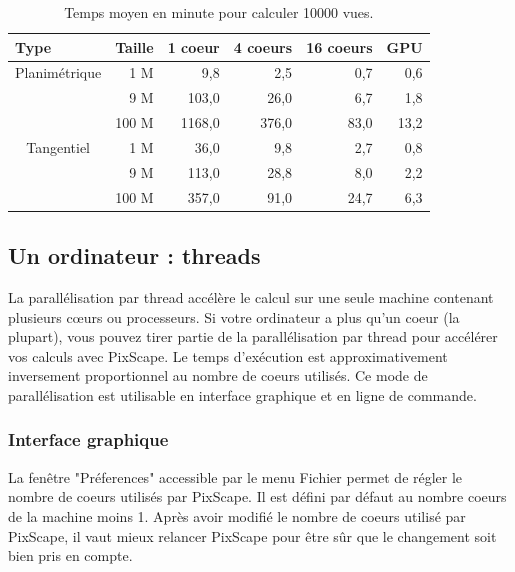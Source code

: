 \documentclass{report}
\begin{document}
\begin{table}[htbp]
	
	\begin{tabular}{|l|r|r|r|r|r|}
		\hline
		Type & \multicolumn{1}{l|}{Taille} & \multicolumn{1}{l|}{1 coeur} & \multicolumn{1}{l|}{4 coeurs} & \multicolumn{1}{l|}{16 coeurs} & \multicolumn{1}{l|}{GPU} \\ \hline
		\multicolumn{ 1}{|c|}{Planimétrique} & 1 M & 9,8 & 2,5 & 0,7 & 0,6 \\ \cline{ 2- 6}
		\multicolumn{ 1}{|l|}{} & 9 M & 103,0 & 26,0 & 6,7 & 1,8 \\ \cline{ 2- 6}
		\multicolumn{ 1}{|l|}{} & 100 M & 1168,0 & 376,0 & 83,0 & 13,2 \\ \hline
		\multicolumn{ 1}{|c|}{Tangentiel} & 1 M & 36,0 & 9,8 & 2,7 & 0,8 \\ \cline{ 2- 6}
		\multicolumn{ 1}{|l|}{} & 9 M & 113,0 & 28,8 & 8,0 & 2,2 \\ \cline{ 2- 6}
		\multicolumn{ 1}{|l|}{} & 100 M & 357,0 & 91,0 & 24,7 & 6,3 \\ \hline
	\end{tabular}
	\caption{Temps moyen en minute pour calculer 10000 vues.}
	\label{perf_table}
\end{table}



\subsection{Un ordinateur : threads}
\label{thread}
La parallélisation par thread accélère le calcul sur une seule machine contenant plusieurs cœurs ou processeurs.
Si votre ordinateur a plus qu'un coeur (la plupart), vous pouvez tirer partie de la parallélisation par thread pour accélérer vos calculs avec PixScape. Le temps d'exécution est approximativement inversement proportionnel au nombre de coeurs utilisés. Ce mode de parallélisation est utilisable en interface graphique et en ligne de commande.

\subsubsection{Interface graphique}
La fenêtre "Préferences" accessible par le menu Fichier permet de régler le nombre de coeurs utilisés par PixScape. Il est défini par défaut au nombre coeurs de la machine moins 1. Après avoir modifié le nombre de coeurs utilisé par PixScape, il vaut mieux relancer PixScape pour être sûr que le changement soit bien pris en compte.
\end{document}
